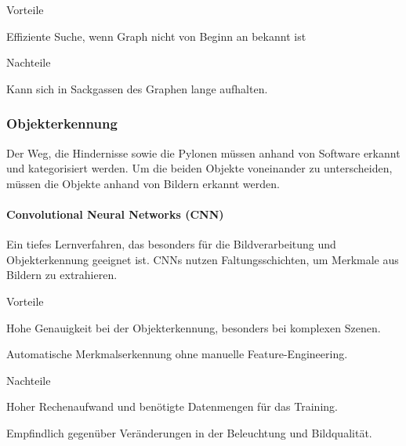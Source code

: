 \begin{minipage}[t]{0.48\textwidth}
\begin{items}
  \item [Vorteile]
  \item Effiziente Suche, wenn Graph nicht von Beginn an bekannt ist
\end{items}
\end{minipage}
\hfill
\begin{minipage}[t]{0.48\textwidth}
\begin{items}
  \item [Nachteile]
  \item Kann sich in Sackgassen des Graphen lange aufhalten.
\end{items}
\end{minipage}

\subsubsection{Objekterkennung}

Der Weg, die Hindernisse sowie die Pylonen müssen anhand von Software erkannt und kategorisiert werden. Um die beiden Objekte voneinander zu unterscheiden, müssen die Objekte anhand von Bildern erkannt werden.

\paragraph{Convolutional Neural Networks (CNN)}

Ein tiefes Lernverfahren, das besonders für die Bildverarbeitung und Objekterkennung geeignet ist. CNNs nutzen Faltungsschichten, um Merkmale aus Bildern zu extrahieren.

\begin{minipage}[t]{0.48\textwidth}
\begin{items}
  \item [Vorteile]
  \item Hohe Genauigkeit bei der Objekterkennung, besonders bei komplexen Szenen.
  \item Automatische Merkmalserkennung ohne manuelle Feature-Engineering.
\end{items}
\end{minipage}
\hfill
\begin{minipage}[t]{0.48\textwidth}
\begin{items}
  \item [Nachteile]
  \item Hoher Rechenaufwand und benötigte Datenmengen für das Training.
  \item Empfindlich gegenüber Veränderungen in der Beleuchtung und Bildqualität.
\end{items}
\end{minipage}

